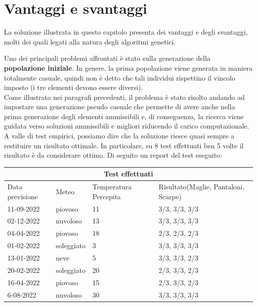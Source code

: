 \documentclass[a4paper, 11pt, oneside]{report}
\begin{document}
            \section{Vantaggi e svantaggi}
            La soluzione illustrata in questo capitolo presenta dei vantaggi e degli svantaggi, molti dei quali legati
            alla natura degli algoritmi genetici.
            \par \noindent Uno dei principali problemi affrontati è stato sulla generazione della \textbf{popolazione iniziale}.
            In genere, la prima popolazione viene generata in maniera totalmente casuale, quindi non è detto che
            tali individui rispettino il vincolo imposto (i tre elementi devono essere diversi).\\
            Come illustrato nei paragrafi precedenti, il problema è stato risolto andando ad impostare una generazione
            pseudo casuale che permette di avere anche nella prima generazione degli elementi ammissibili e, di conseguenza,
            la ricerca viene guidata verso soluzioni ammissibili e migliori riducendo il carico computazionale.\\
            A valle di test empirici, possiamo dire che la soluzione riesce quasi sempre a restituire un risultato ottimale.
            In particolare, su 8 test effettuati ben 5 volte il risultato è da considerare ottimo.
            Di seguito un report del test eseguito:
            \begin{center}
                \begin{tabular}{ |p{3cm}|p{2cm}|p{2cm}||p{4cm}|}
                    \hline
                    \multicolumn{4}{|c|}{Test effettuati} \\
                    \hline
                    Data previsione & Meteo & Temperatura Percepita & Risultato(Maglie, Pantaloni, Scarpe)\\
                    \hline
                    11-09-2022 & piovoso  & 11 & 3/3, 3/3, 3/3\\
                    \hline
                    02-12-2022 & nuvoloso  & 13 & 3/3, 3/3, 3/3\\
                    \hline
                    04-04-2022 & piovoso  & 18 & 2/3, 2/3, 2/3\\
                    \hline
                    01-02-2022 & soleggiato  & 3 & 3/3, 3/3, 3/3\\
                    \hline
                    13-01-2022 & neve  & 5 & 3/3, 3/3, 2/3\\
                    \hline
                    20-02-2022 & soleggiato  & 20 & 2/3, 3/3, 2/3\\
                    \hline
                    16-04-2022 & piovoso  & 15 & 2/3, 3/3, 2/3\\
                    \hline
                    6-08-2022 & nuvoloso  & 30 & 3/3, 3/3, 3/3\\
                    \hline
                \end{tabular}
            \end{center}
\end{document}
